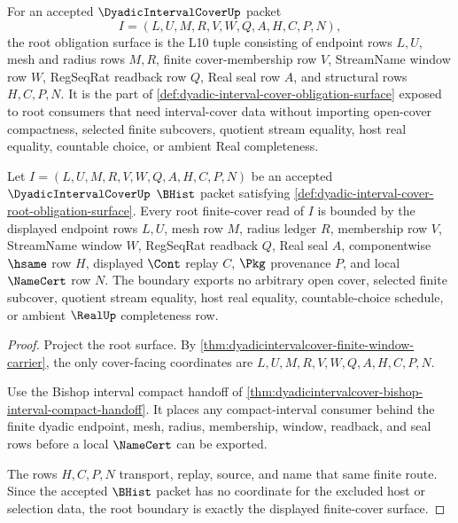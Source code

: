 \begin{definition}
\label{def:dyadic-interval-cover-root-obligation-surface}
For an accepted $\DyadicIntervalCoverUp$ packet
$$
I=(L,U,M,R,V,W,Q,A,H,C,P,N),
$$
the root obligation surface is the L10 tuple consisting of endpoint rows $L,U$, mesh and radius rows $M,R$, finite cover-membership row $V$, StreamName window row $W$, RegSeqRat readback row $Q$, Real seal row $A$, and structural rows $H,C,P,N$. It is the part of \autoref{def:dyadic-interval-cover-obligation-surface} exposed to root consumers that need interval-cover data without importing open-cover compactness, selected finite subcovers, quotient stream equality, host real equality, countable choice, or ambient Real completeness.
\end{definition}

\begin{theorem}
\label{thm:dyadic-interval-cover-root-finite-cover-boundary}
Let $I=(L,U,M,R,V,W,Q,A,H,C,P,N)$ be an accepted $\DyadicIntervalCoverUp$ $\BHist$ packet satisfying \autoref{def:dyadic-interval-cover-root-obligation-surface}. Every root finite-cover read of $I$ is bounded by the displayed endpoint rows $L,U$, mesh row $M$, radius ledger $R$, membership row $V$, StreamName window $W$, RegSeqRat readback $Q$, Real seal $A$, componentwise $\hsame$ row $H$, displayed $\Cont$ replay $C$, $\Pkg$ provenance $P$, and local $\NameCert$ row $N$. The boundary exports no arbitrary open cover, selected finite subcover, quotient stream equality, host real equality, countable-choice schedule, or ambient $\RealUp$ completeness row.
\end{theorem}
\begin{proof}
Project the root surface. By \autoref{thm:dyadicintervalcover-finite-window-carrier}, the only cover-facing coordinates are $L,U,M,R,V,W,Q,A,H,C,P,N$.

Use the Bishop interval compact handoff of \autoref{thm:dyadicintervalcover-bishop-interval-compact-handoff}. It places any compact-interval consumer behind the finite dyadic endpoint, mesh, radius, membership, window, readback, and seal rows before a local $\NameCert$ can be exported.

The rows $H,C,P,N$ transport, replay, source, and name that same finite route. Since the accepted $\BHist$ packet has no coordinate for the excluded host or selection data, the root boundary is exactly the displayed finite-cover surface.
\end{proof}

